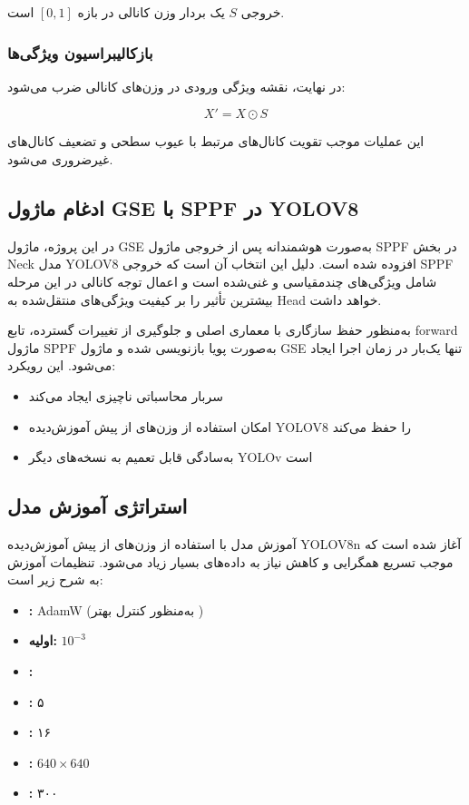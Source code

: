 \documentclass[a4paper, 10pt, twocolumn]{article}
\begin{document}
	خروجی \(S\) یک بردار وزن کانالی در بازه \([0,1]\) است.
	
	\subsubsection{بازکالیبراسیون ویژگی‌ها}
	
	در نهایت، نقشه ویژگی ورودی در وزن‌های کانالی ضرب می‌شود:
	
	\[
	X' = X \odot S
	\]
	
	این عملیات موجب تقویت کانال‌های مرتبط با عیوب سطحی و تضعیف کانال‌های غیرضروری می‌شود.
	
	\subsection{ادغام ماژول GSE با SPPF در YOLOV8}
	
	در این پروژه، ماژول GSE به‌صورت هوشمندانه پس از خروجی ماژول SPPF در بخش Neck مدل YOLOV8 افزوده شده است. دلیل این انتخاب آن است که خروجی SPPF شامل ویژگی‌های چندمقیاسی و غنی‌شده است و اعمال توجه کانالی در این مرحله بیشترین تأثیر را بر کیفیت ویژگی‌های منتقل‌شده به Head خواهد داشت.
	
	به‌منظور حفظ سازگاری با معماری اصلی و جلوگیری از تغییرات گسترده، تابع forward ماژول SPPF به‌صورت پویا بازنویسی شده و ماژول GSE تنها یک‌بار در زمان اجرا ایجاد می‌شود. این رویکرد:
	\begin{itemize}
		\item سربار محاسباتی ناچیزی ایجاد می‌کند
		\item امکان استفاده از وزن‌های از پیش آموزش‌دیده YOLOV8 را حفظ می‌کند
		\item به‌سادگی قابل تعمیم به نسخه‌های دیگر YOLOv است
	\end{itemize}
	
	\subsection{استراتژی آموزش مدل}
	
	آموزش مدل با استفاده از وزن‌های از پیش آموزش‌دیده YOLOV8n آغاز شده است که موجب تسریع همگرایی و کاهش نیاز به داده‌های بسیار زیاد می‌شود. تنظیمات آموزش به شرح زیر است:
	
	\begin{itemize}
		\item \textbf{:} AdamW (به‌منظور کنترل بهتر )
		\item \textbf{ اولیه:} \(10^{-3}\)
		\item \textbf{:} 
		\item \textbf{:} ۵ 
		\item \textbf{:} ۱۶
		\item \textbf{:} \(640 \times 640\)
		\item \textbf{:} ۳۰۰
	\end{itemize}
	
\end{document}

